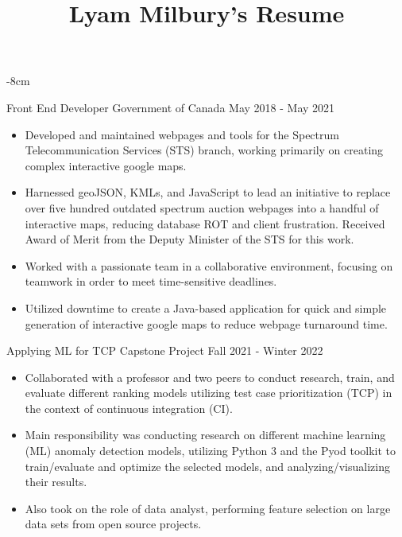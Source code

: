 \documentclass[10pt,a4paper]{altacv}
\begin{document}
\title{Lyam Milbury's Resume}

\begin{adjustwidth}{}{-8cm}
\makecvheader
\end{adjustwidth}


\cvproject
	{Front End Developer}
    {Government of Canada}
    {May 2018 - May 2021}
\begin{itemize}
	\item {Developed and maintained webpages and tools for the Spectrum Telecommunication Services (STS) branch, working primarily on creating complex interactive google maps.}
	\item {Harnessed geoJSON, KMLs, and JavaScript to lead an initiative to replace over five hundred outdated spectrum auction webpages into a handful of interactive maps, reducing database ROT and client frustration. Received Award of Merit from the Deputy Minister of the STS for this work.}
	\item {Worked with a passionate team in a collaborative environment, focusing on teamwork in order to meet time-sensitive deadlines.}
	\item {Utilized downtime to create a Java-based application for quick and simple generation of interactive google maps to reduce webpage turnaround time.}
\end{itemize}


\cvproject
	{Applying ML for TCP}
    {Capstone Project}
    {Fall 2021 - Winter 2022}
\begin{itemize}
	\item {Collaborated with a professor and two peers to conduct research, train, and evaluate different ranking models utilizing test case prioritization (TCP) in the context of continuous integration (CI).}
	\item {Main responsibility was conducting research on different machine learning (ML) anomaly detection models, utilizing Python 3 and the Pyod toolkit to train/evaluate and optimize the selected models, and analyzing/visualizing their results.}
	\item {Also took on the role of data analyst, performing feature selection on large data sets from open source projects.}
\end{itemize}
\end{document}
